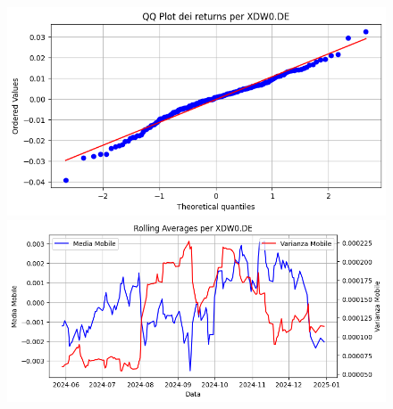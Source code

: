 \documentclass{article}%
\begin{document}
%


\begin{figure}[htbp]%
\begin{minipage}{0.48\textwidth}%
\includegraphics[width=\linewidth]{immagini_tickers/XDW0.DE_qq_plot.png}%
\end{minipage}%
\begin{minipage}{0.48\textwidth}%
\includegraphics[width=\linewidth]{immagini_tickers/XDW0.DE_rolling_averages.png}%
\end{minipage}%
\end{figure}

%
\end{document}

